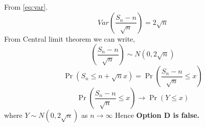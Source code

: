 \documentclass{beamer}
\providecommand{\brak}[1]{\ensuremath{\left(#1\right)}}
\begin{document}
\begin{frame}
From \eqref{eq:var}.
\begin{equation}
    Var\brak{\frac{S_{n}-n}{\sqrt{n}}}=2\sqrt{n}
\end{equation}
From Central limit theorem we can write,
\begin{equation}
    \brak{{\frac{S_{n}-n}{\sqrt{n}}}} \sim N(0,2 \sqrt{n})\label{eq:D}
\end{equation}
\begin{equation}
     \Pr\brak{S_n \leq n+ \sqrt{n}x}=\Pr\brak{{\frac{S_{n}-n}{\sqrt{n}}}\leq x}
\end{equation}
\begin{equation}
    \Pr\brak{{\frac{S_{n}-n}{\sqrt{n}}}\leq x} \to \Pr(Y \leq x)
\end{equation}
where $Y \sim N(0,2\sqrt{n})$ as $n \to \infty$
Hence \textbf{Option D is false.}

\end{frame}
\end{document}
